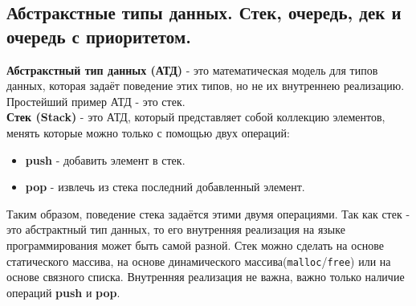 \documentclass{article}
\begin{document}
\newpage

\subsection*{Абстракстные типы данных. Стек, очередь, дек и очередь с приоритетом.}
\quad

\textbf{Абстракстный тип данных (АТД)} - это математическая модель для типов данных, которая задаёт поведение этих типов, но не их внутреннею реализацию. Простейший пример АТД - это стек.\\

\textbf{Стек (Stack)} - это АТД, который представляет собой коллекцию элементов, менять которые можно только с помощью двух операций:
\begin{itemize}
\item \textbf{push} - добавить элемент в стек.
\item \textbf{pop} - извлечь из стека последний добавленный элемент.
\end{itemize}
Таким образом, поведение стека задаётся этими двумя операциями. Так как стек - это абстрактный тип данных, то его внутренняя реализация на языке программирования может быть самой разной. Стек можно сделать на основе статического массива, на основе динамического массива(\texttt{malloc}/\texttt{free}) или на основе связного списка. Внутренняя реализация не важна, важно только наличие операций \textbf{push} и \textbf{pop}. \\
\end{document}
